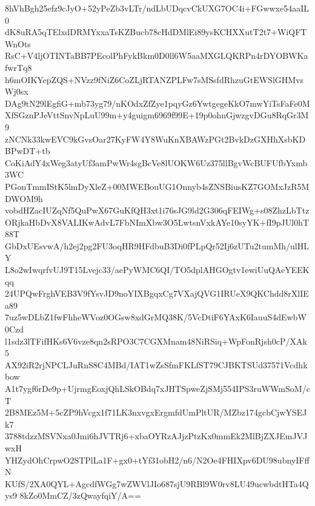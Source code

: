 8hVhBgh25efz9cJyO+52yPeZb3vLTr/ndLbUDqcvCkUXG7OC4i+FGwwxe54aaIL0
dK8uRA5qTElxdDRMYxxaTsKZBucb78cHdDMlEi89ysKCHXXutT2t7+WiQFTWnOts
RsC+V4ljOTINTaBB7PEcolPhFykBkm0D0ll6W5aaMXGLQKRPn4rDYOBWKafwrTq8
h6mOIKYepZQS+NVzz9fNiZ6CoZLjRTANZPLFw7sMSsfdRhzuGtEWSlGHMvsWj0sx
DAg9tN29lEgfiG+mb73yg79/nKOdxZfZye1pqyGz6YwtgegeKkO7mwYiTsFaFe0M
XfSGznPJeVttSnvNpLuU99m+y4guigm6969f99E+19p0ohnGjwzgvDGu8RqGr3M9
zNCNk33kwEVC9kGvsOar27KyFW4Y8WuKnXBAWzPGt2BvkDzGXHhXsbKDBPwDT+tb
CoKiAdY4xWeg3atyUf3amPwWr4sgBcVe8lUOKW6Uz375llBgvWcBUFUfbYxmb3WC
PGonTmmIStK5lmDyXleZ+00MWEBouUG1Onnyb4sZNSBiusKZ7GOMxJzR5MDWOM9h
vobdHZacIUZqNf5QuPwX67GuKfQH3xt1i76sJG9ld2G306qFEIWg+s08ZhzLbTtz
ORjkaHbDvX8VALIKwAdvL7FbNImXbw3O5LwtsnVxkAYe10syYK+fI9pJUl0hT88T
GbDxUEsvwA/h2ej2pg2FU3oqHR9HFdbuB3Di0fPLpQr52Ij6zUTu2tumMh/ulHLY
L8o2wIwqrfvUJ9T15Lvejc33/aePyWMC6QI/TO5dplAHGOgtv1ewiUuQAeYEEKqq
24UPQwFrghVEB3V9fYsvJD9noYIXBgqxCg7VXajQVG1IRUeX9QKChdd8rXlIEa89
7uz5wDLbZ1fwFhheWVoz0OGsw8xdGrMQ38K/5VcDtiF6YAxK6IauuS4dEwbW0Czd
l1sdz3lTFifHKs6V6vze8qn2sRPO3C7CGXMnam48NiRSiq+WpFonRjsh0cP/XAk5
AX92iR2rjNPCLJuRnS8C4MBd/IAT1wZsSfmFKLfST79CJBKTSUd37571Vcdhkbow
A1t7ygf6rDe9p+UjrmgEoxjQhLSkOBdq7xJHTSpweZjSMj554IPS3ruWWmSoM/cT
2B8MEz5M+5cZP9hVcgx1f71LK3nxvgxErgmfdUmPltUR/MZbz174gcbCjwYSEJk7
3788tdzzMSVNxa0Jmi6hJVTRj6+xbaOYRzAJjzPtzKx0mmEk2MlBjZXJEmJVJwxH
YHZydOhCrpwO2STPlLa1F+gx0+tYf31obH2/n6/N2Oe4FHIXpv6DU98ubnyIFffN
KUfS/2XA0QYL+AgcdfWGg7wZWVlJIo687sjU9RBl9W0rv8LU49ucwbdtHTa4Qys9
8kZo0MmCZ/3zQwayfqiY/A==

